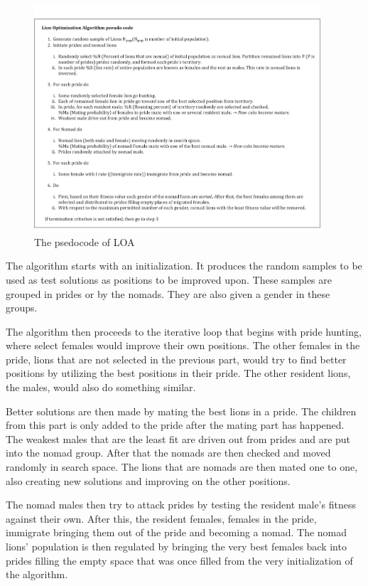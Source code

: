 \begin{figure}[H]
\begin{center}
\includegraphics[width=0.95\textwidth]{img/pseudocode}
\caption{The psedocode of LOA}
\end{center}
\end{figure}

The algorithm starts with an initialization. It produces the random samples to be used as test solutions as positions to be improved upon. These samples are grouped in prides or by the nomads. They are also given a gender in these groups.

\par The algorithm then proceeds to the iterative loop that begins with pride hunting, where select females would improve their own positions. The other females in the pride, lions that are not selected in the previous part, would try to find better positions by utilizing the best positions in their pride. The other resident lions, the males, would also do something similar.

\par Better solutions are then made by mating the best lions in a pride. The children from this part is only added to the pride after the mating part has happened. The weakest males that are the least fit are driven out from prides and are put into the nomad group. After that the nomads are then checked and moved randomly in search space. The lions that are nomads are then mated one to one, also creating new solutions and improving on the other positions.

\par The nomad males then try to attack prides by testing the resident male's fitness against their own. After this, the resident females, females in the pride, immigrate bringing them out of the pride and becoming a nomad. The nomad lions' population is then regulated by bringing the very best females back into prides filling the empty space that was once filled from the very initialization of the algorithm.

